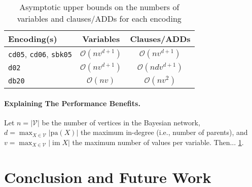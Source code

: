 \documentclass{article}
\theoremstyle{definition}
\theoremstyle{remark}
\DeclareMathOperator{\im}{im}
\begin{document}
\begin{table}
  \centering
  \caption{Asymptotic upper bounds on the numbers of variables and clauses/ADDs
    for each encoding}
  \label{tbl:asymptotes}
  \begin{tabular}{lcc}
    \toprule
    Encoding(s) & Variables & Clauses/ADDs \\
    \midrule
    \texttt{cd05}, \texttt{cd06}, \texttt{sbk05} & $\mathcal{O}(nv^{d+1})$ & $\mathcal{O}(nv^{d+1})$ \\
    \texttt{d02} & $\mathcal{O}(nv^{d+1})$ & $\mathcal{O}(ndv^{d+1})$ \\
    \texttt{db20} & $\mathcal{O}(nv)$ & $\mathcal{O}(nv^2)$ \\
    \bottomrule
  \end{tabular}
\end{table}

\paragraph{Explaining The Performance Benefits.} Let $n = |\mathcal{V}|$ be the
number of vertices in the Bayesian network, $d = \max_{X \in \mathcal{V}}
|\mathrm{pa}(X)|$ the maximum in-degree (i.e., number of parents), and $v =
\max_{X \in \mathcal{V}} |\im X|$ the maximum number of values per variable.
Then... \cref{tbl:asymptotes}.



\section{Conclusion and Future Work}
\end{document}
